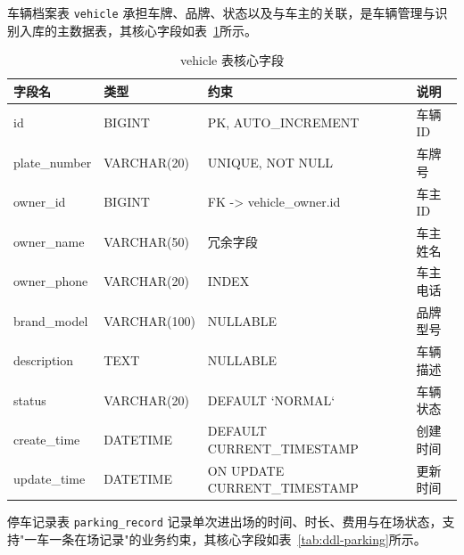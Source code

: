 \documentclass{wzuthesis} %
\begin{document}
车辆档案表 \texttt{vehicle} 承担车牌、品牌、状态以及与车主的关联，是车辆管理与识别入库的主数据表，其核心字段如表~\ref{tab:ddl-vehicle}所示。

\begin{table}[H]
\centering
\footnotesize
\caption{vehicle 表核心字段}
\label{tab:ddl-vehicle}
\begin{tabular}{|p{2.2cm}|p{2.2cm}|p{4.0cm}|p{4.5cm}|}
\hline
字段名 & 类型 & 约束 & 说明 \\
\hline
id & BIGINT & PK, AUTO\_INCREMENT & 车辆 ID \\
\hline
plate\_number & VARCHAR(20) & UNIQUE, NOT NULL & 车牌号 \\
\hline
owner\_id & BIGINT & FK -> vehicle\_owner.id & 车主 ID \\
\hline
owner\_name & VARCHAR(50) & 冗余字段 & 车主姓名 \\
\hline
owner\_phone & VARCHAR(20) & INDEX & 车主电话 \\
\hline
brand\_model & VARCHAR(100) & NULLABLE & 品牌型号 \\
\hline
description & TEXT & NULLABLE & 车辆描述 \\
\hline
status & VARCHAR(20) & DEFAULT `NORMAL` & 车辆状态 \\
\hline
create\_time & DATETIME & DEFAULT CURRENT\_TIMESTAMP & 创建时间 \\
\hline
update\_time & DATETIME & ON UPDATE CURRENT\_TIMESTAMP & 更新时间 \\
\hline
\end{tabular}
\end{table}

停车记录表 \texttt{parking\_record} 记录单次进出场的时间、时长、费用与在场状态，支持"一车一条在场记录"的业务约束，其核心字段如表~\ref{tab:ddl-parking}所示。
\end{document}
